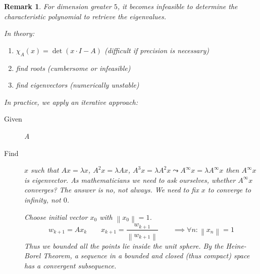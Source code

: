\documentclass{article}
\newtheorem{remark}{Remark}  \numberwithin{remark}{section}
\newcommand{\norm}[1]{\left\|#1\right\|}
\begin{document}
\begin{remark} %
  For dimension greater $5$, it becomes infeasible to determine the characteristic polynomial to retrieve the eigenvalues.

  In theory:
  \begin{enumerate}
    \item $\chi_A(x) = \det(x \cdot I - A)$ (difficult if precision is necessary)
    \item find roots (cumbersome or infeasible)
    \item find eigenvectors (numerically unstable)
  \end{enumerate}

  In practice, we apply an iterative approach:
  \begin{description}
    \item[Given] A
    \item[Find] $x$ such that $Ax = \lambda x$, $A^2 x = \lambda Ax$, $A^3 x = \lambda A^2 x \leadsto A^\infty x = \lambda A^\infty x$ then $A^\infty x$ is eigenvector. As mathematicians we need to ask ourselves, whether $A^\infty x$ converges? The answer is no, not always. We need to fix $x$ to converge to infinity, not $0$.

    Choose initial vector $x_0$ with $\norm{x_0} = 1$.
    \[ w_{k+1} = Ax_k \qquad x_{k+1} = \frac{w_{k+1}}{\norm{w_{k+1}}} \qquad \implies \forall n: \norm{x_n} = 1 \]
    Thus we bounded all the points lie inside the unit sphere.
    By the Heine-Borel Theorem, a sequence in a bounded and closed (thus compact) space has a convergent subsequence.


\end{description}
\end{remark}
\end{document}
